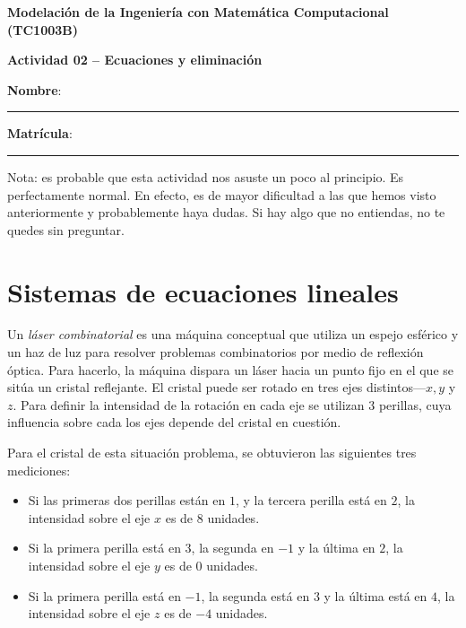 \documentclass[spanish, 10pt]{article}
\begin{document}
\begin{center}
	{\Large \textbf{Modelación de la Ingeniería con Matemática Computacional (TC1003B)}}
	
	\bigskip
	{\large \textbf{Actividad 02 -- Ecuaciones y eliminación}}
\end{center}

\bigskip
{\large \textbf{Nombre}: \rule{13.7 cm}{0.4mm}}



\bigskip
{\large \textbf{Matrícula}: \rule{5 cm}{0.4mm}} %

\bigskip

{\footnotesize Nota: es probable que esta actividad nos asuste un poco al principio. Es perfectamente normal.
En efecto, es de mayor dificultad a las que hemos visto anteriormente y probablemente haya dudas.
Si hay algo que no entiendas, no te quedes sin preguntar.}

\section{Sistemas de ecuaciones lineales}

\vspace{3ex}

Un \textit{láser combinatorial} es una máquina conceptual que utiliza un espejo esférico y un haz de luz para resolver problemas combinatorios por medio de reflexión óptica.
Para hacerlo, la máquina dispara un láser hacia un punto fijo en el que se sitúa un cristal reflejante.
El cristal puede ser rotado en tres ejes distintos---$x, y $ y $z$.
Para definir la intensidad de la rotación en cada eje se utilizan 3 perillas, cuya influencia sobre cada los ejes depende del cristal en cuestión.

Para el cristal de esta situación problema, se obtuvieron las siguientes tres mediciones:

\begin{itemize}
    \item Si las primeras dos perillas están en $1$, y la tercera perilla está en $2$, la intensidad sobre el eje $x$ es de $8$ unidades.
    \item Si la primera perilla está en $3$, la segunda en $-1$ y la última en $2$, la intensidad sobre el eje $y$ es de $0$ unidades.
    \item Si la primera perilla está en $-1$, la segunda está en $3$ y la última está en $4$, la intensidad sobre el eje $z$ es de $-4$ unidades.
\end{itemize}
\end{document}
